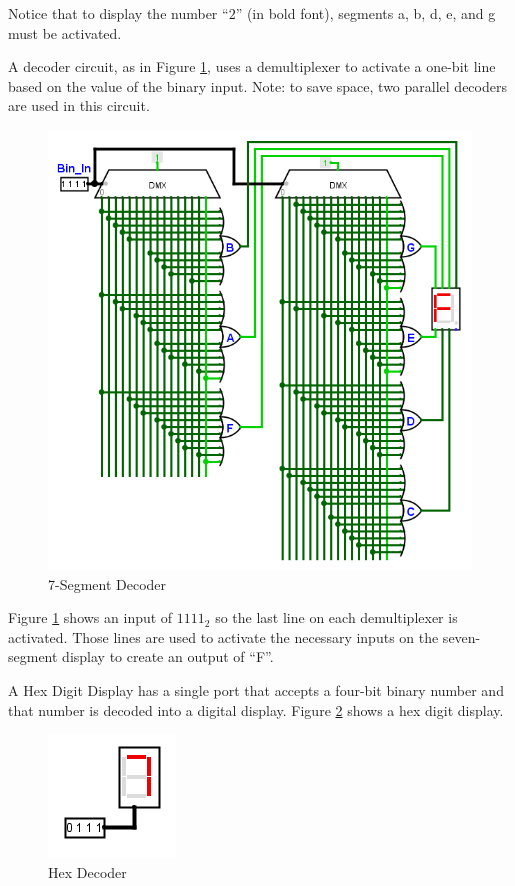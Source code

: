 Notice that to display the number ``$ 2 $'' (in bold font), segments \textsf{a}, \textsf{b}, \textsf{d}, \textsf{e}, and \textsf{g} must be activated. 

A decoder circuit, as in Figure \ref{fig:08_16}, uses a demultiplexer to activate a one-bit line based on the value of the binary input. Note: to save space, two parallel decoders are used in this circuit.

\begin{figure}[H]
	\centering
	\includegraphics[width=\maxwidth{.95\linewidth}]{gfx/08_16}
	\caption{7-Segment Decoder}
	\label{fig:08_16}
\end{figure}

Figure \ref{fig:08_16} shows an input of $ 1111_2 $ so the last line on each demultiplexer is activated. Those lines are used to activate the necessary inputs on the seven-segment display to create an output of ``F''. 

A Hex Digit Display has a single port that accepts a four-bit binary number and that number is decoded into a digital display. Figure \ref{fig:08_17} shows a hex digit display. 

\begin{figure}[H]
	\centering
	\includegraphics[width=\maxwidth{.95\linewidth}]{gfx/08_17}
	\caption{Hex Decoder}
	\label{fig:08_17}
\end{figure}

